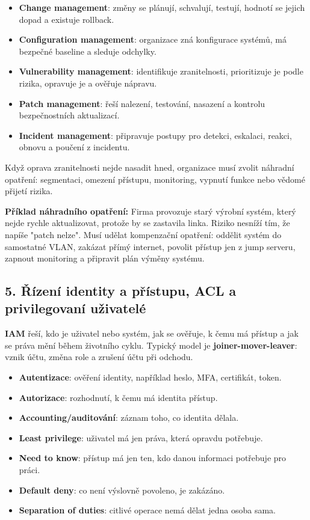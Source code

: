 \documentclass[11pt,a4paper]{article}
\newcommand{\itpr}[1]{\medskip\noindent\colorbox{green!8}{\parbox{\dimexpr\linewidth-2\fboxsep}{#1}}\medskip}
\begin{document}
\begin{itemize}
    \item \textbf{Change management}: změny se plánují, schvalují, testují, hodnotí se jejich dopad a existuje rollback.
    \item \textbf{Configuration management}: organizace zná konfigurace systémů, má bezpečné baseline a sleduje odchylky.
    \item \textbf{Vulnerability management}: identifikuje zranitelnosti, prioritizuje je podle rizika, opravuje je a ověřuje nápravu.
    \item \textbf{Patch management}: řeší nalezení, testování, nasazení a kontrolu bezpečnostních aktualizací.
    \item \textbf{Incident management}: připravuje postupy pro detekci, eskalaci, reakci, obnovu a poučení z incidentu.
\end{itemize}

Když oprava zranitelnosti nejde nasadit hned, organizace musí zvolit náhradní opatření: segmentaci, omezení přístupu, monitoring, vypnutí funkce nebo vědomé přijetí rizika.

\itpr{\textbf{Příklad náhradního opatření:} Firma provozuje starý výrobní systém, který nejde rychle aktualizovat, protože by se zastavila linka. Riziko nesníží tím, že napíše "patch nelze". Musí udělat kompenzační opatření: oddělit systém do samostatné VLAN, zakázat přímý internet, povolit přístup jen z jump serveru, zapnout monitoring a připravit plán výměny systému.}

\subsection*{5. Řízení identity a přístupu, ACL a privilegovaní uživatelé}

\textbf{IAM} řeší, kdo je uživatel nebo systém, jak se ověřuje, k čemu má přístup a jak se práva mění během životního cyklu. Typický model je \textbf{joiner-mover-leaver}: vznik účtu, změna role a zrušení účtu při odchodu.

\begin{itemize}
    \item \textbf{Autentizace}: ověření identity, například heslo, MFA, certifikát, token.
    \item \textbf{Autorizace}: rozhodnutí, k čemu má identita přístup.
    \item \textbf{Accounting/auditování}: záznam toho, co identita dělala.
    \item \textbf{Least privilege}: uživatel má jen práva, která opravdu potřebuje.
    \item \textbf{Need to know}: přístup má jen ten, kdo danou informaci potřebuje pro práci.
    \item \textbf{Default deny}: co není výslovně povoleno, je zakázáno.
    \item \textbf{Separation of duties}: citlivé operace nemá dělat jedna osoba sama.
\end{itemize}
\end{document}
